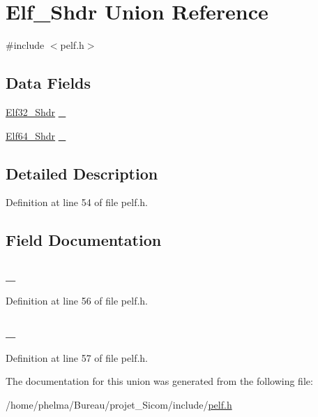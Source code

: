 \hypertarget{union_elf___shdr}{\section{Elf\-\_\-\-Shdr Union Reference}
\label{union_elf___shdr}
}


{\ttfamily \#include $<$pelf.\-h$>$}

\subsection*{Data Fields}
\begin{DoxyCompactItemize}
\item 
\hyperlink{struct_elf32___shdr}{Elf32\-\_\-\-Shdr} \hyperlink{union_elf___shdr_a6944e0a2a86ffe4eac06d3c415c6aaee}{\-\_}
\item 
\hyperlink{struct_elf64___shdr}{Elf64\-\_\-\-Shdr} \hyperlink{union_elf___shdr_a907ea6fce41cc900224c9a64e8a4374f}{\-\_}
\end{DoxyCompactItemize}


\subsection{Detailed Description}


Definition at line 54 of file pelf.\-h.



\subsection{Field Documentation}
\hypertarget{union_elf___shdr_a6944e0a2a86ffe4eac06d3c415c6aaee}{
\subsubsection[{\-\_\-32}]{ \-\_}}\label{union_elf___shdr_a6944e0a2a86ffe4eac06d3c415c6aaee}


Definition at line 56 of file pelf.\-h.

\hypertarget{union_elf___shdr_a907ea6fce41cc900224c9a64e8a4374f}{
\subsubsection[{\-\_\-64}]{ \-\_}}\label{union_elf___shdr_a907ea6fce41cc900224c9a64e8a4374f}


Definition at line 57 of file pelf.\-h.



The documentation for this union was generated from the following file\-:\begin{DoxyCompactItemize}
\item 
/home/phelma/\-Bureau/projet\-\_\-\-Sicom/include/\hyperlink{pelf_8h}{pelf.\-h}\end{DoxyCompactItemize}
